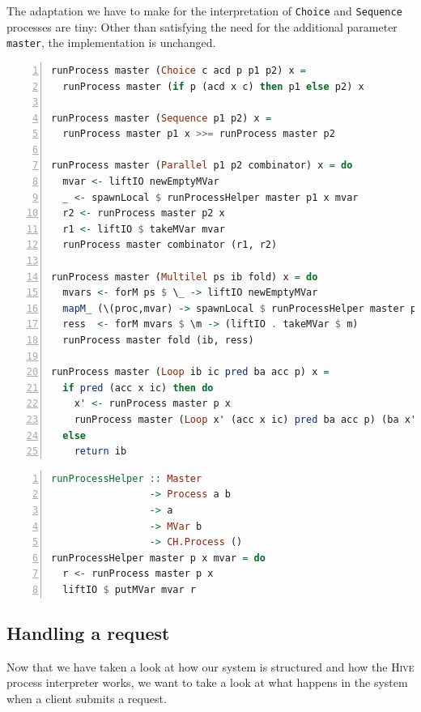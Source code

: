The adaptation we have to make for the interpretation of \texttt{Choice} and \texttt{Sequence} processes are tiny: Other than satisfying the need for the additional parameter \texttt{master}, the implementation is unchanged.
\begin{lstlisting}[language=Haskell,caption=Implementation of the interpreter for \texttt{Choice} and \texttt{Sequence} processes.,label=lst:runprocess_choice,numbers=left,frame=bt]
runProcess master (Choice c acd p p1 p2) x =
  runProcess master (if p (acd x c) then p1 else p2) x

runProcess master (Sequence p1 p2) x =
  runProcess master p1 x >>= runProcess master p2

runProcess master (Parallel p1 p2 combinator) x = do
  mvar <- liftIO newEmptyMVar
  _ <- spawnLocal $ runProcessHelper master p1 x mvar
  r2 <- runProcess master p2 x
  r1 <- liftIO $ takeMVar mvar
  runProcess master combinator (r1, r2)

runProcess master (Multilel ps ib fold) x = do
  mvars <- forM ps $ \_ -> liftIO newEmptyMVar
  mapM_ (\(proc,mvar) -> spawnLocal $ runProcessHelper master proc x mvar) (ps `zip` mvars)
  ress  <- forM mvars $ \m -> (liftIO . takeMVar $ m)
  runProcess master fold (ib, ress)

runProcess master (Loop ib ic pred ba acc p) x =
  if pred (acc x ic) then do
    x' <- runProcess master p x
    runProcess master (Loop x' (acc x ic) pred ba acc p) (ba x')
  else
    return ib
\end{lstlisting}

\begin{lstlisting}[language=Haskell,caption=Auxiliary process for the interpretation of \texttt{Parallel} and \texttt{Multilel} processes.,label=lst:runprocesshelper,numbers=left,frame=bt]
runProcessHelper :: Master
                 -> Process a b
                 -> a
                 -> MVar b
                 -> CH.Process ()
runProcessHelper master p x mvar = do
  r <- runProcess master p x
  liftIO $ putMVar mvar r
\end{lstlisting}


\subsection{Handling a request}
Now that we have taken a look at how our system is structured and how the \textsc{Hive} process interpreter works, we want to take a look at what happens in the system when a client submits a request.

